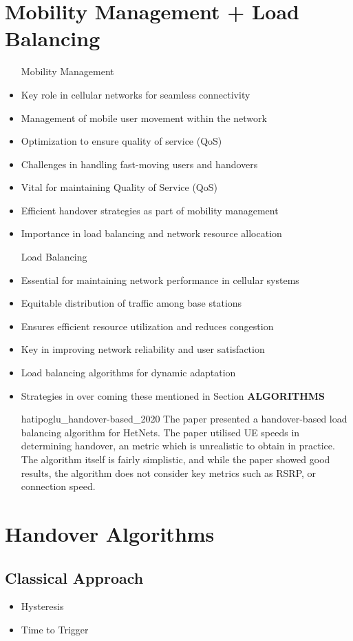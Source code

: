 \section{Mobility Management + Load Balancing}
\begin{itemize}
\item[Mobility Management]
  \item Key role in cellular networks for seamless connectivity
  \item Management of mobile user movement within the network
  \item Optimization to ensure quality of service (QoS)
  \item Challenges in handling fast-moving users and handovers
  \item Vital for maintaining Quality of Service (QoS)
  \item Efficient handover strategies as part of mobility management
  \item Importance in load balancing and network resource allocation
\item[Load Balancing]
    \item Essential for maintaining network performance in cellular systems
    \item Equitable distribution of traffic among base stations
    \item Ensures efficient resource utilization and reduces congestion
    \item Key in improving network reliability and user satisfaction
    \item Load balancing algorithms for dynamic adaptation
    \item Strategies in over coming these mentioned in Section \textbf{ALGORITHMS}
    \item[{hatipoglu_handover-based_2020}] The paper presented a handover-based load balancing algorithm for HetNets. The paper utilised UE speeds in determining handover, an metric which is unrealistic to obtain in practice. The algorithm itself is fairly simplistic, and while the paper showed good results, the algorithm does not consider key metrics such as RSRP, or connection speed.
\end{itemize}


\section{Handover Algorithms}
\subsection{Classical Approach}
\begin{itemize}
    \item Hysteresis
    \item Time to Trigger
\end{itemize}
